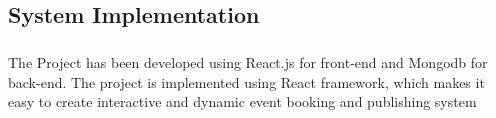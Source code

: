 \documentclass[twoside,a4paper,openright]{report} %
\begin{document}
\begin{flushleft}
	\chapter{System Implementation }
\end{flushleft}
\paragraph{}
\hspace{1.5cm}
The Project has been developed using React.js for front-end and Mongodb for back-end. The project is implemented using React framework, which makes it easy to create interactive and dynamic event booking and publishing system
\end{document}
